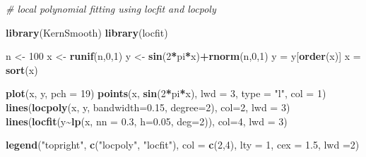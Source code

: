 \documentclass[
]{book}
\newenvironment{Shaded}{\begin{snugshade}}{\end{snugshade}}
\newcommand{\AttributeTok}[1]{\textcolor[rgb]{0.13,0.29,0.53}{#1}}
\newcommand{\CommentTok}[1]{\textcolor[rgb]{0.56,0.35,0.01}{\textit{#1}}}
\newcommand{\DecValTok}[1]{\textcolor[rgb]{0.00,0.00,0.81}{#1}}
\newcommand{\FloatTok}[1]{\textcolor[rgb]{0.00,0.00,0.81}{#1}}
\newcommand{\FunctionTok}[1]{\textcolor[rgb]{0.13,0.29,0.53}{\textbf{#1}}}
\newcommand{\NormalTok}[1]{#1}
\newcommand{\OtherTok}[1]{\textcolor[rgb]{0.56,0.35,0.01}{#1}}
\newcommand{\SpecialCharTok}[1]{\textcolor[rgb]{0.81,0.36,0.00}{\textbf{#1}}}
\newcommand{\StringTok}[1]{\textcolor[rgb]{0.31,0.60,0.02}{#1}}
\theoremstyle{definition}
\theoremstyle{definition}
\theoremstyle{definition}
\theoremstyle{definition}
\theoremstyle{remark}
\begin{document}
\begin{Shaded}
\begin{Highlighting}[]
    \CommentTok{\# local polynomial fitting using locfit and locpoly}
    
    \FunctionTok{library}\NormalTok{(KernSmooth)}
    \FunctionTok{library}\NormalTok{(locfit)}
    
\NormalTok{    n }\OtherTok{\textless{}{-}} \DecValTok{100}
\NormalTok{    x }\OtherTok{\textless{}{-}} \FunctionTok{runif}\NormalTok{(n,}\DecValTok{0}\NormalTok{,}\DecValTok{1}\NormalTok{)}
\NormalTok{    y }\OtherTok{\textless{}{-}} \FunctionTok{sin}\NormalTok{(}\DecValTok{2}\SpecialCharTok{*}\NormalTok{pi}\SpecialCharTok{*}\NormalTok{x)}\SpecialCharTok{+}\FunctionTok{rnorm}\NormalTok{(n,}\DecValTok{0}\NormalTok{,}\DecValTok{1}\NormalTok{)}
\NormalTok{    y }\OtherTok{=}\NormalTok{ y[}\FunctionTok{order}\NormalTok{(x)]}
\NormalTok{    x }\OtherTok{=} \FunctionTok{sort}\NormalTok{(x)}
    
    \FunctionTok{plot}\NormalTok{(x, y, }\AttributeTok{pch =} \DecValTok{19}\NormalTok{)}
    \FunctionTok{points}\NormalTok{(x, }\FunctionTok{sin}\NormalTok{(}\DecValTok{2}\SpecialCharTok{*}\NormalTok{pi}\SpecialCharTok{*}\NormalTok{x), }\AttributeTok{lwd =} \DecValTok{3}\NormalTok{, }\AttributeTok{type =} \StringTok{"l"}\NormalTok{, }\AttributeTok{col =} \DecValTok{1}\NormalTok{)}
    \FunctionTok{lines}\NormalTok{(}\FunctionTok{locpoly}\NormalTok{(x, y, }\AttributeTok{bandwidth=}\FloatTok{0.15}\NormalTok{, }\AttributeTok{degree=}\DecValTok{2}\NormalTok{), }\AttributeTok{col=}\DecValTok{2}\NormalTok{, }\AttributeTok{lwd =} \DecValTok{3}\NormalTok{)}
    \FunctionTok{lines}\NormalTok{(}\FunctionTok{locfit}\NormalTok{(y}\SpecialCharTok{\textasciitilde{}}\FunctionTok{lp}\NormalTok{(x, }\AttributeTok{nn =} \FloatTok{0.3}\NormalTok{, }\AttributeTok{h=}\FloatTok{0.05}\NormalTok{, }\AttributeTok{deg=}\DecValTok{2}\NormalTok{)), }\AttributeTok{col=}\DecValTok{4}\NormalTok{, }\AttributeTok{lwd =} \DecValTok{3}\NormalTok{)}
    
    \FunctionTok{legend}\NormalTok{(}\StringTok{"topright"}\NormalTok{, }\FunctionTok{c}\NormalTok{(}\StringTok{"locpoly"}\NormalTok{, }\StringTok{"locfit"}\NormalTok{), }\AttributeTok{col =} \FunctionTok{c}\NormalTok{(}\DecValTok{2}\NormalTok{,}\DecValTok{4}\NormalTok{), }\AttributeTok{lty =} \DecValTok{1}\NormalTok{, }\AttributeTok{cex =} \FloatTok{1.5}\NormalTok{, }\AttributeTok{lwd =}\DecValTok{2}\NormalTok{)}
\end{Highlighting}
\end{Shaded}
\end{document}
